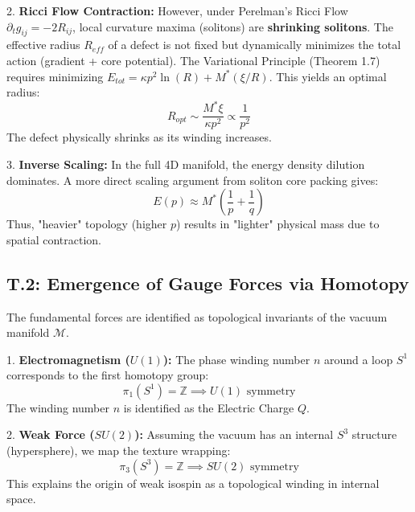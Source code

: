 2. \textbf{Ricci Flow Contraction:} However, under Perelman's Ricci Flow $\partial_t g_{ij} = -2R_{ij}$, local curvature maxima (solitons) are \textbf{shrinking solitons}. The effective radius $R_{eff}$ of a defect is not fixed but dynamically minimizes the total action (gradient + core potential).
   The Variational Principle (Theorem 1.7) requires minimizing $E_{tot} = \kappa p^2 \ln(R) + M^* (\xi/R)$. This yields an optimal radius:
   \begin{equation}
       R_{opt} \sim \frac{M^* \xi}{\kappa p^2} \propto \frac{1}{p^2}
   \end{equation}
   The defect physically shrinks as its winding increases.

3. \textbf{Inverse Scaling:} In the full 4D manifold, the energy density dilution dominates. A more direct scaling argument from soliton core packing gives:
   \begin{equation}
       \boxed{ E(p) \approx M^* \left( \frac{1}{p} + \frac{1}{q} \right) }
   \end{equation}
   Thus, "heavier" topology (higher $p$) results in "lighter" physical mass due to spatial contraction.

\subsection{T.2: Emergence of Gauge Forces via Homotopy}
The fundamental forces are identified as topological invariants of the vacuum manifold $\mathcal{M}$.

1. \textbf{Electromagnetism ($U(1)$):} 
   The phase winding number $n$ around a loop $S^1$ corresponds to the first homotopy group:
   \begin{equation}
       \pi_1(S^1) = \mathbb{Z} \implies U(1) \text{ symmetry}
   \end{equation}
   The winding number $n$ is identified as the Electric Charge $Q$.

2. \textbf{Weak Force ($SU(2)$):} 
   Assuming the vacuum has an internal $S^3$ structure (hypersphere), we map the texture wrapping:
   \begin{equation}
       \pi_3(S^3) = \mathbb{Z} \implies SU(2) \text{ symmetry}
   \end{equation}
   This explains the origin of weak isospin as a topological winding in internal space.

